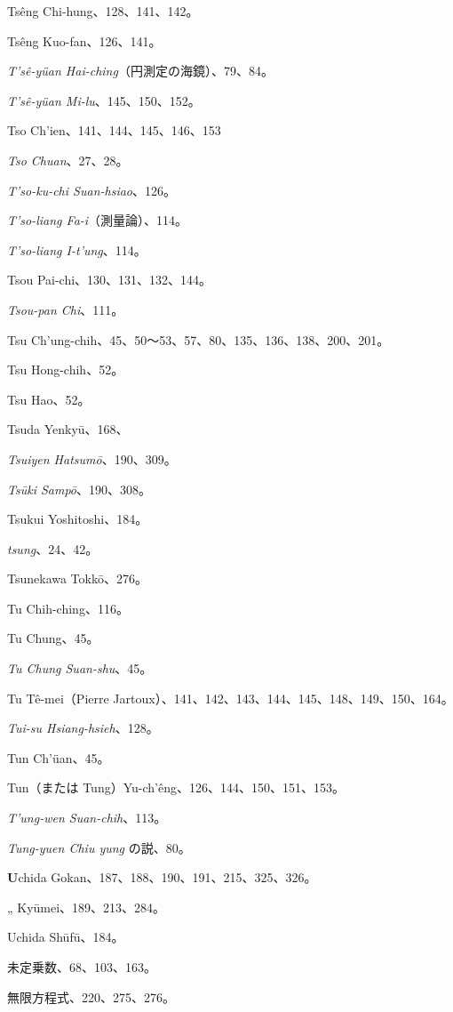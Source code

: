 \documentclass[11pt]{article}
\begin{document}
Tsêng Chi-hung、128、141、142。\par
Tsêng Kuo-fan、126、141。\par
\emph{T'sê-yüan Hai-ching}（円測定の海鏡）、79、84。\par
\emph{T'sê-yüan Mi-lu}、145、150、152。\par
Tso Ch'ien、141、144、145、146、153\par
\emph{Tso Chuan}、27、28。\par
\emph{T'so-ku-chi Suan-hsiao}、126。\par
\emph{T'so-liang Fa-i}（測量論）、114。\par
\emph{T'so-liang I-t'ung}、114。\par
Tsou Pai-chi、130、131、132、144。\par
\emph{Tsou-pan Chi}、111。\par
Tsu Ch'ung-chih、45、50～53、57、80、135、136、138、200、201。\par
Tsu Hong-chih、52。\par
Tsu Hao、52。\par
Tsuda Yenkyū、168、\par
\emph{Tsuiyen Hatsumō}、190、309。\par
\emph{Tsūki Sampō}、190、308。\par
Tsukui Yoshitoshi、184。\par
\emph{tsung}、24、42。\par
Tsunekawa Tokkō、276。\par
Tu Chih-ching、116。\par
Tu Chung、45。\par
\emph{Tu Chung Suan-shu}、45。\par
Tu Tê-mei（Pierre Jartoux）、141、142、143、144、145、148、149、150、164。\par
\emph{Tui-su Hsiang-hsieh}、128。\par
Tun Ch'üan、45。\par
Tun（または Tung）Yu-ch'êng、126、144、150、151、153。\par
\emph{T'ung-wen Suan-chih}、113。\par
\emph{Tung-yuen Chiu yung} の説、80。\par
\medskip
\textbf{U}chida Gokan、187、188、190、191、215、325、326。\par
\quad „ Kyūmei、189、213、284。\par
Uchida Shūfū、184。\par
未定乗数、68、103、163。\par
無限方程式、220、275、276。\par
\end{document}
